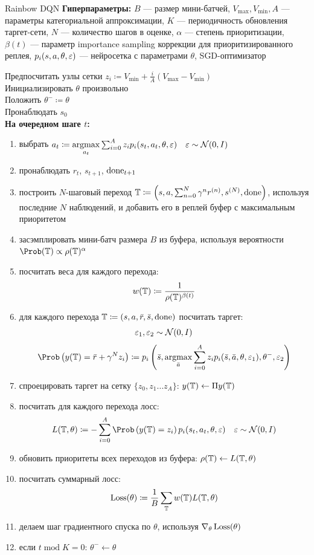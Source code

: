 \begin{algorithm}[label = rainbowalg]{Rainbow DQN}
\textbf{Гиперпараметры:} $B$ --- размер мини-батчей, $V_{\max}, V_{\min}, A$ --- параметры категориальной аппроксимации, $K$ --- периодичность обновления таргет-сети, $N$ --- количество шагов в оценке, $\alpha$ --- степень приоритизации, $\beta(t)$ --- параметр importance sampling коррекции для приоритизированного реплея, $p_i(s, a, \theta, \varepsilon)$ --- нейросетка с параметрами $\theta$, SGD-оптимизатор

\vspace{0.3cm}
Предпосчитать узлы сетки $z_i \coloneqq V_{\min} + \frac{i}{A}(V_{\max} - V_{\min})$ \\
Инициализировать $\theta$ произвольно \\
Положить $\theta^- \coloneqq \theta$ \\
Пронаблюдать $s_0$ \\
\textbf{На очередном шаге $t$:}
\begin{enumerate}
    \item выбрать $a_t \coloneqq \mathop{\mathrm{argmax}}\limits_{a_t} \sum_{i=0}^A z_i p_i(s_t, a_t, \theta, \varepsilon) \quad \varepsilon \sim \mathcal{N}(0, I)$
    \item пронаблюдать $r_t$, $s_{t+1}$, $\mathrm{done}_{t+1}$
    \item построить $N$-шаговый переход $\mathbb{T} \coloneqq \left( s, a, \sum_{n=0}^N \gamma^n r^{(n)}, s^{(N)}, \mathrm{done} \right)$, используя последние $N$ наблюдений, и добавить его в реплей буфер с максимальным приоритетом %
    \item засэмплировать мини-батч размера $B$ из буфера, используя вероятности $\Prob (\T) \propto \rho(\T)^\alpha$
    \item посчитать веса для каждого перехода:
    $$w(\mathbb{T}) \coloneqq \frac{1}{\rho(\mathbb{T})^{\beta(t)}}$$
    \item для каждого перехода $\mathbb{T} \coloneqq (s, a, \bar{r}, \bar{s}, \mathrm{done})$ посчитать таргет:
    $$\varepsilon_1, \varepsilon_2 \sim \mathcal{N}(0, I)$$
    $$\Prob \left( y(\T) = \bar{r} + \gamma^N z_i \right) \coloneqq p_i\left( \bar{s}, \argmax_{\bar{a}} \sum_{i=0}^A z_i p_i(\bar{s}, \bar{a}, \theta, \eps_1), \theta^-, \eps_2 \right)$$
    \item спроецировать таргет на сетку $\{ z_0, z_1 \dots z_{A} \}$: $y(\mathbb{T}) \leftarrow \Pi y(\mathbb{T})$ 
    \item посчитать для каждого перехода лосс:
    $$L(\T, \theta) \coloneqq -\sum_{i=0}^{A} \Prob \left( y(\T) = z_i \right) p_i(s_t, a_t, \theta, \eps) \quad \eps \sim \N(0, I)$$
    \item обновить приоритеты всех переходов из буфера: $\rho(\mathbb{T}) \gets L(\mathbb{T}, \theta)$
    \item посчитать суммарный лосс:
    $$\operatorname{Loss}(\theta) \coloneqq \frac{1}{B}\sum_{\mathbb{T}} w(\mathbb{T})L(\mathbb{T}, \theta)$$
    \item делаем шаг градиентного спуска по $\theta$, используя $\nabla_\theta \operatorname{Loss}(\theta)$
    \item если $t \operatorname{mod} K = 0$: $\theta^- \gets \theta$
\end{enumerate}
\end{algorithm}